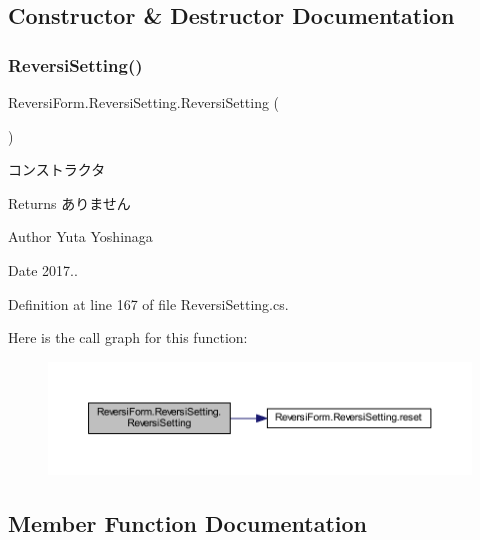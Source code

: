 \subsection{Constructor \& Destructor Documentation}
\mbox{\label{class_reversi_form_1_1_reversi_setting_a985e02a2cbf355f46474efc51a5b3728}} 
\subsubsection{\texorpdfstring{Reversi\+Setting()}{ReversiSetting()}}
{\footnotesize\ttfamily Reversi\+Form.\+Reversi\+Setting.\+Reversi\+Setting (\begin{DoxyParamCaption}{ }\end{DoxyParamCaption})}



コンストラクタ 

\begin{DoxyReturn}{Returns}
ありません 
\end{DoxyReturn}
\begin{DoxyAuthor}{Author}
Yuta Yoshinaga 
\end{DoxyAuthor}
\begin{DoxyDate}{Date}
2017.. 
\end{DoxyDate}


Definition at line 167 of file Reversi\+Setting.\+cs.

Here is the call graph for this function\+:\nopagebreak
\begin{figure}[H]
\begin{center}
\leavevmode
\includegraphics[width=350pt]{class_reversi_form_1_1_reversi_setting_a985e02a2cbf355f46474efc51a5b3728_cgraph}
\end{center}
\end{figure}


\subsection{Member Function Documentation}
\mbox{\label{class_reversi_form_1_1_reversi_setting_a5ba1f3b862a9938fb89045c3b22dec51}} 
